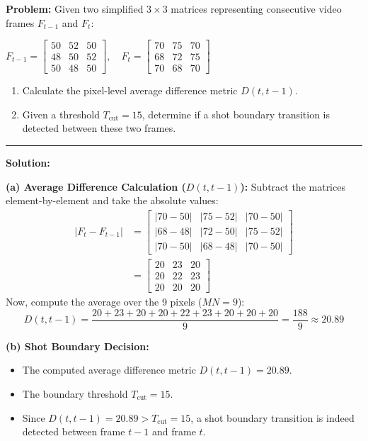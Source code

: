 \documentclass[12pt,a4paper]{article}
\begin{document}
\begin{tcolorbox}[examplebox, title={Temporal Differencing and Boundary Detection}]
\textbf{Problem:} Given two simplified $3 \times 3$ matrices representing consecutive video frames $F_{t-1}$ and $F_t$:
\begin{center}
  $F_{t-1} = \begin{bmatrix} 50 & 52 & 50 \\ 48 & 50 & 52 \\ 50 & 48 & 50 \end{bmatrix}, \quad
  F_t = \begin{bmatrix} 70 & 75 & 70 \\ 68 & 72 & 75 \\ 70 & 68 & 70 \end{bmatrix}$
\end{center}
\begin{enumerate}[label=(\alph*), leftmargin=*, itemsep=2.5pt]
  \item Calculate the pixel-level average difference metric $D(t, t-1)$.
  \item Given a threshold $T_{\text{cut}} = 15$, determine if a shot boundary transition is detected between these two frames.
\end{enumerate}

\par\noindent\rule{\linewidth}{0.5pt}\par
\textbf{Solution:}

\textbf{(a) Average Difference Calculation ($D(t, t-1)$):}
Subtract the matrices element-by-element and take the absolute values:
\begin{align*}
  |F_t - F_{t-1}| &= \begin{bmatrix} |70 - 50| & |75 - 52| & |70 - 50| \\ |68 - 48| & |72 - 50| & |75 - 52| \\ |70 - 50| & |68 - 48| & |70 - 50| \end{bmatrix} \\
  &= \begin{bmatrix} 20 & 23 & 20 \\ 20 & 22 & 23 \\ 20 & 20 & 20 \end{bmatrix}
\end{align*}
Now, compute the average over the 9 pixels ($MN = 9$):
\begin{equation*}
  D(t, t-1) = \frac{20 + 23 + 20 + 20 + 22 + 23 + 20 + 20 + 20}{9} = \frac{188}{9} \approx 20.89
\end{equation*}

\textbf{(b) Shot Boundary Decision:}
\begin{itemize}[leftmargin=*, itemsep=2pt]
  \item The computed average difference metric $D(t, t-1) = 20.89$.
  \item The boundary threshold $T_{\text{cut}} = 15$.
  \item Since $D(t, t-1) = 20.89 > T_{\text{cut}} = 15$, a shot boundary transition is indeed detected between frame $t-1$ and frame $t$.
\end{itemize}
\end{tcolorbox}
\end{document}
